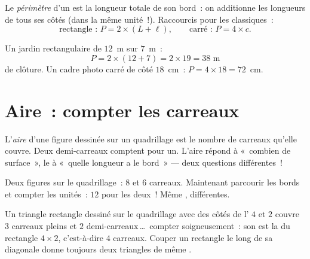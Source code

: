 \begin{definition}[Périmètre]\label{def:g4:measure:perimeter}
Le \emph{périmètre} d'un  est la longueur
totale de son bord~: on additionne les longueurs de tous ses côtés
(dans la même unité~!). Raccourcis pour les classiques~:
\[
\text{rectangle~: } P = 2 \times (L + \ell),
\qquad
\text{carré~: } P = 4 \times c .
\]
\end{definition}

\begin{example}\label{ex:g4:measure:perimeter}
Un jardin rectangulaire de $12$~m sur $7$~m~:
\[
P = 2 \times (12 + 7) = 2 \times 19 = 38 \text{ m}
\]
de clôture. Un cadre photo carré de côté $18$~cm~:
$P = 4 \times 18 = 72$~cm.
\end{example}

\section{Aire~: compter les carreaux}

\begin{definition}\label{def:g4:measure:area}
L'\emph{aire} d'une figure dessinée sur un quadrillage
est le nombre de carreaux qu'elle couvre. Deux demi-carreaux
comptent pour un. L'aire répond à «~combien de surface~», le
 à «~quelle longueur a le bord~» --- deux questions
différentes~!
\end{definition}

\begin{omfigure}

{\small Deux figures sur le quadrillage~:  $8$ et $6$ carreaux.
Maintenant parcourir les bords et compter les unités~: $12$ pour
les deux~! Même ,  différentes.}
\end{omfigure}

\begin{example}\label{ex:g4:measure:half}
Un triangle rectangle dessiné sur le quadrillage avec des côtés de
l' $4$ et $2$ couvre $3$ carreaux pleins et $2$
demi-carreaux\,\dots\ compter soigneusement~: son  est la 
du rectangle $4 \times 2$, c'est-à-dire $4$ carreaux. Couper un
rectangle le long de sa diagonale donne toujours deux triangles de
même .
\end{example}


